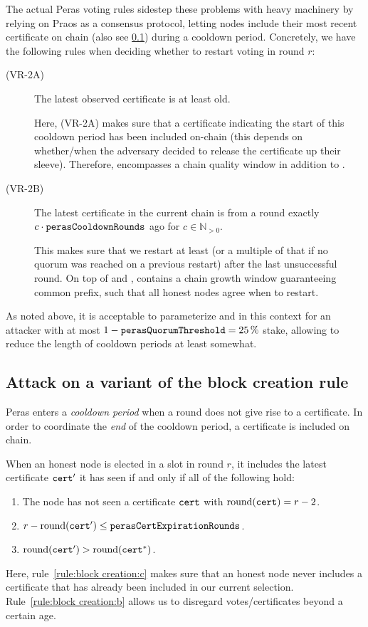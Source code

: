 The actual Peras voting rules sidestep these problems with heavy machinery by relying on Praos as a consensus protocol, letting nodes include their most recent certificate on chain (also see \cref{sec:attack block creation rule}) during a cooldown period.
Concretely, we have the following rules when deciding whether to restart voting in round $r$:
\begin{description}
\item[(VR-2A)] The latest observed certificate is at least \perasIgnoranceRounds{} old.

  Here, (VR-2A) makes sure that a certificate indicating the start of this cooldown period has been included on-chain (this depends on whether/when the adversary decided to release the certificate up their sleeve).
  Therefore, \perasIgnoranceRounds{} encompasses a chain quality window \Tcq{} in addition to \Theal{}.
\item[(VR-2B)] The latest certificate in the current chain is from a round exactly $c\cdot \mathtt{perasCooldownRounds}$ ago for $c \in\mathbb{N}_{>0}$.

  This makes sure that we restart at least \perasCooldownRounds{} (or a multiple of that if no quorum was reached on a previous restart) after the last unsuccessful round.
  On top of \Theal{} and \Tcq{}, \perasCooldownRounds{} contains a chain growth window \Tcp{} guaranteeing common prefix, such that all honest nodes agree when to restart.
\end{description}

As noted above, it is acceptable to parameterize \Tcq{} and \Tcp{} in this context for an attacker with at most $1-\mathtt{perasQuorumThreshold}{} = \qty{25}{\percent}$ stake, allowing to reduce the length of cooldown periods at least somewhat.

\subsection{Attack on a variant of the block creation rule}\label{sec:attack block creation rule}

Peras enters a \emph{cooldown period} when a round does not give rise to a certificate.
In order to coordinate the \emph{end} of the cooldown period, a certificate is included on chain.

When an honest node is elected in a slot in round $r$, it includes the latest certificate $\mathtt{cert}'$ it has seen if and only if all of the following hold:
\begin{enumerate}
\item\label{rule:block creation:a} The node has not seen a certificate $\mathtt{cert}$ with $\operatorname{round}(\mathtt{cert})=r-2$.
\item\label{rule:block creation:b} $r-\operatorname{round}(\mathtt{cert}') \le \mathtt{perasCertExpirationRounds}$.
\item\label{rule:block creation:c} $\operatorname{round}(\mathtt{cert}') > \operatorname{round}(\mathtt{cert}^*)$.
\end{enumerate}
Here, rule~\ref{rule:block creation:c} makes sure that an honest node never includes a certificate that has already been included in our current selection.
Rule~\ref{rule:block creation:b} allows us to disregard votes/certificates beyond a certain age.

